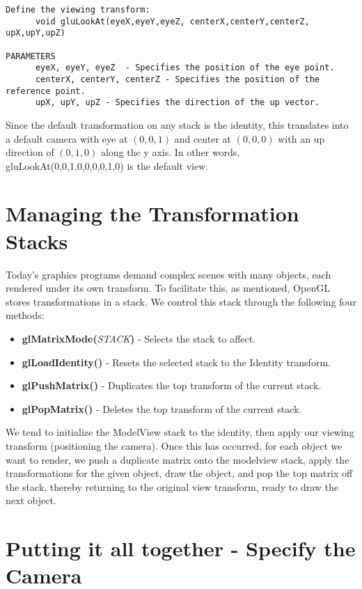 \documentclass[]{article}
\begin{document}
\begin{verbatim}
Define the viewing transform:
	  void gluLookAt(eyeX,eyeY,eyeZ, centerX,centerY,centerZ, upX,upY,upZ)
        
PARAMETERS
	  eyeX,	eyeY, eyeZ  - Specifies the	position of the	eye point.
	  centerX, centerY, centerZ - Specifies the	position of the	reference point.
	  upX, upY, upZ	- Specifies the	direction of the up vector.

\end{verbatim}

Since the default transformation on any stack is the identity, this translates into a default camera with eye at $(0,0,1)$ and center at $(0,0,0)$ with an up direction of $(0,1,0)$ along the y axis. In other words, gluLookAt(0,0,1,0,0,0,0,1,0) is the default view.

\section{Managing the Transformation Stacks}

Today's graphics programs demand complex scenes with many objects, each rendered under its own transform. To facilitate this, as mentioned, OpenGL stores transformations in a stack. We control this stack through the following four methods:

\begin{itemize}
    \item \textbf{glMatrixMode(}\emph{STACK}\textbf{)} - Selects the stack to affect.
    \item \textbf{glLoadIdentity()} - Resets the selected stack to the Identity transform.
    \item \textbf{glPushMatrix()} - Duplicates the top transform of the current stack.
    \item \textbf{glPopMatrix()} - Deletes the top transform of the current stack.
\end{itemize}

We tend to initialize the ModelView stack to the identity, then apply our viewing transform (positioning the camera). Once this has occurred, for each object we want to render, we push a duplicate matrix onto the modelview stack, apply the transformations for the given object, draw the object, and pop the top matrix off the stack, thereby returning to the original view transform, ready to draw the next object.

\section{Putting it all together - Specify the Camera}
\end{document}
